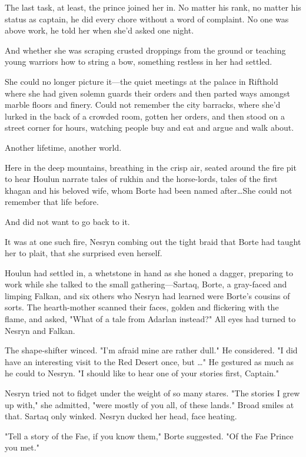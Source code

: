 The last task, at least, the prince joined her in.
No matter his rank, no matter his status as captain, he did every chore without a word of complaint.
No one was above work, he told her when she'd asked one night.

And whether she was scraping crusted droppings from the ground or teaching young warriors how to string a bow, something restless in her had settled.

She could no longer picture it---the quiet meetings at the palace in Rifthold where she had given solemn guards their orders and then parted ways amongst marble floors and finery.
Could not remember the city barracks, where she'd lurked in the back of a crowded room, gotten her orders, and then stood on a street corner for hours, watching people buy and eat and argue and walk about.

Another lifetime, another world.

Here in the deep mountains, breathing in the crisp air, seated around the fire pit to hear Houlun narrate tales of rukhin and the horse-lords, tales of the first khagan and his beloved wife, whom Borte had been named after\ldots She could not remember that life before.

And did not want to go back to it.

It was at one such fire, Nesryn combing out the tight braid that Borte had taught her to plait, that she surprised even herself.

Houlun had settled in, a whetstone in hand as she honed a dagger, preparing to work while she talked to the small gathering---Sartaq, Borte, a gray-faced and limping Falkan, and six others who Nesryn had learned were Borte's cousins of sorts.
The hearth-mother scanned their faces, golden and flickering with the flame, and asked, "What of a tale from Adarlan instead?"
All eyes had turned to Nesryn and Falkan.

The shape-shifter winced.
"I'm afraid mine are rather dull."
He considered.
"I did have an interesting visit to the Red Desert once, but \ldots" He gestured as much as he could to Nesryn.
"I should like to hear one of your stories first, Captain."

Nesryn tried not to fidget under the weight of so many stares.
"The stories I grew up with," she admitted, "were mostly of you all, of these lands."
Broad smiles at that.
Sartaq only winked.
Nesryn ducked her head, face heating.

"Tell a story of the Fae, if you know them," Borte suggested.
"Of the Fae Prince you met."

